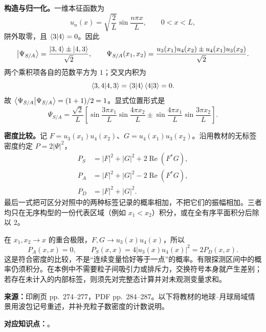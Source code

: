 \begin{checkedsolution}
\textbf{构造与归一化。}一维本征函数为
\begin{equation}
  u_n(x)=\sqrt{\frac2L}\sin\frac{n\pi x}{L},\qquad 0<x<L,
\end{equation}
阱外取零，且 $\left\langle 3 \middle| 4 \right\rangle=0$。因此
\begin{equation}
  \left|\Psi_{S/A}\right\rangle=\frac{\left|3,4\right\rangle\pm\left|4,3\right\rangle}{\sqrt2},\qquad
  \Psi_{S/A}(x_1,x_2)=\frac{u_3(x_1)u_4(x_2)\pm u_4(x_1)u_3(x_2)}{\sqrt2}.
\end{equation}
两个乘积项各自的范数平方为 $1$；交叉内积为
\begin{equation}
  \left\langle 3,4 \middle| 4,3 \right\rangle=\left\langle 3 \middle| 4 \right\rangle\left\langle 4 \middle| 3 \right\rangle=0.
\end{equation}
故 $\left\langle \Psi_{S/A} \middle| \Psi_{S/A} \right\rangle=(1+1)/2=1$。显式位置形式是
\begin{equation}
  \Psi_{S/A}=\frac{\sqrt2}{L}
   \left[\sin\frac{3\pi x_1}{L}\sin\frac{4\pi x_2}{L}
    \pm\sin\frac{4\pi x_1}{L}\sin\frac{3\pi x_2}{L}\right].
\end{equation}

\textbf{密度比较。}记 $F=u_3(x_1)u_4(x_2)$、$G=u_4(x_1)u_3(x_2)$。沿用教材的无标签密度约定 $P=2|\Psi|^2$，
\begin{align}
  P_S&=|F|^2+|G|^2+2\operatorname{Re}(F^*G),\\
  P_A&=|F|^2+|G|^2-2\operatorname{Re}(F^*G),\\
  P_D&=|F|^2+|G|^2.
\end{align}
最后一式把可区分对照中的两种标签记录的概率相加，不把它们的振幅相加。三者均只在无序构型的一份代表区域（例如 $x_1<x_2$）积分，或在全有序平面积分后除以 $2$。

在 $x_1,x_2\to x$ 的重合极限，$F,G\to u_3(x)u_4(x)$，所以
\begin{equation}
  \boxed{P_A(x,x)=0,\qquad
    P_S(x,x)=4|u_3(x)u_4(x)|^2=2P_D(x,x)}.
\end{equation}
这是符合密度的比较，不是“连续变量恰好等于一点”的概率。有限探测区间中的概率仍须积分。在本例中不需要粒子间吸引力或排斥力，交换符号本身就产生差别；若存在未计入的内部标签，则须先对完整态计算并对未观测变量求和。
\end{checkedsolution}

\textbf{来源：}印刷页 pp.~274--277，PDF pp.~284--287。以下将教材的地球--月球局域情景用波包记号重述，并补充粒子数密度的计数说明。

\textbf{对应知识点：}。

